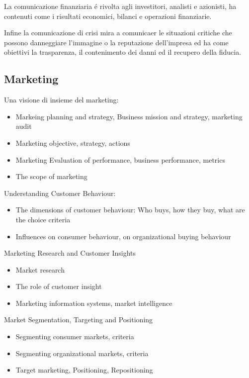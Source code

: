 \documentclass{article}
\begin{document}
La comunicazione finanziaria \'e rivolta agli investitori, analisti e azionisti, ha contenuti come i risultati economici, bilanci e operazioni finanziarie. 

Infine la comunicazione di crisi mira a comunicaer le situazioni critiche che possono danneggiare l'immagine o la reputazione dell'impresa ed ha come obiettivi la trasparenza, il contenimento dei danni ed il recupero della fiducia.

\subsection{Marketing}
Una visione di insieme del marketing:

\begin{itemize}
    \item Markeing planning and strategy, Business mission and strategy, marketing audit
    \item Marketing objective, strategy, actions
    \item Marketing Evaluation of performance, business performance, metrics
    \item The scope of marketing
\end{itemize}

Understanding Customer Behaviour:
\begin{itemize}
    \item The dimensions of customer behaviour: Who buys, how they buy, what are the choice criteria
    \item  Influences on consumer behaviour, on organizational buying behaviour
\end{itemize}

Marketing Research and Customer Insights
\begin{itemize}
    \item Market research
    \item The role of customer insight
    \item Marketing information systems, market intelligence
\end{itemize}

Market Segmentation, Targeting and Positioning
\begin{itemize}
    \item Segmenting consumer markets, criteria
    \item Segmenting organizational markets, criteria
    \item Target marketing, Positioning, Repositioning
\end{itemize}
\end{document}
